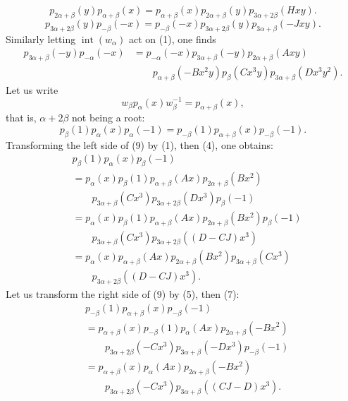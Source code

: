 \begin{equation}\tag{6}
p_{2\alpha+\beta}(y)p_{\alpha+\beta}(x)=p_{\alpha+\beta}(x)p_{2\alpha+\beta}(y)p_{3\alpha+2\beta}(Hxy).
\end{equation}
\begin{equation}\tag{7}
p_{3\alpha+2\beta}(y)p_{-\beta}(-x)=p_{-\beta}(-x)p_{3\alpha+2\beta}(y)p_{3\alpha+\beta}(-Jxy).
\end{equation}
Similarly letting $\operatorname{int}(w_\alpha)$ act on (1), one finds
\begin{equation}\tag{8}
\begin{aligned}
p_{3\alpha+\beta}(-y)p_{-\alpha}(-x)&=p_{-\alpha}(-x)p_{3\alpha+\beta}(-y)p_{2\alpha+\beta}(Axy)\\
&\qquad p_{\alpha+\beta}(-Bx^2y)p_\beta(Cx^3y)p_{3\alpha+\beta}(Dx^3y^2).
\end{aligned}
\end{equation}
Let us write
\[
w_\beta p_\alpha(x)w_\beta^{-1}=p_{\alpha+\beta}(x),
\]
that is, $\alpha+2\beta$ not being a root:
\begin{equation}\tag{9}
p_\beta(1)p_\alpha(x)p_\alpha(-1)=p_{-\beta}(1)p_{\alpha+\beta}(x)p_{-\beta}(-1).
\end{equation}
Transforming the left side of (9) by (1), then (4), one obtains:
\begin{equation}\tag{10}
\begin{aligned}
&p_\beta(1)p_\alpha(x)p_\beta(-1)\\
&=p_\alpha(x)p_\beta(1)p_{\alpha+\beta}(Ax)p_{2\alpha+\beta}(Bx^2)\\
&\qquad p_{3\alpha+\beta}(Cx^3)p_{3\alpha+2\beta}(Dx^3)p_\beta(-1)\\
&=p_\alpha(x)p_\beta(1)p_{\alpha+\beta}(Ax)p_{2\alpha+\beta}(Bx^2)p_\beta(-1)\\
&\qquad p_{3\alpha+\beta}(Cx^3)p_{3\alpha+2\beta}((D-CJ)x^3)\\
&=p_\alpha(x)p_{\alpha+\beta}(Ax)p_{2\alpha+\beta}(Bx^2)p_{3\alpha+\beta}(Cx^3)\\
&\qquad p_{3\alpha+2\beta}((D-CJ)x^3).
\end{aligned}
\end{equation}
Let us transform the right side of (9) by (5), then (7):
\begin{equation}\tag{11}
\begin{aligned}
&p_{-\beta}(1)p_{\alpha+\beta}(x)p_{-\beta}(-1)\\
&=p_{\alpha+\beta}(x)p_{-\beta}(1)p_\alpha(Ax)p_{2\alpha+\beta}(-Bx^2)\\
&\qquad p_{3\alpha+2\beta}(-Cx^3)p_{3\alpha+\beta}(-Dx^3)p_{-\beta}(-1)\\
&=p_{\alpha+\beta}(x)p_\alpha(Ax)p_{2\alpha+\beta}(-Bx^2)\\
&\qquad p_{3\alpha+2\beta}(-Cx^3)p_{3\alpha+\beta}((CJ-D)x^3).
\end{aligned}
\end{equation}
